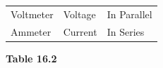 {\begin{center}
\begin{xtabular*}{\mytablewidth}[t]{|p{10\mystarwidth}|p{10\mystarwidth}|p{10\mystarwidth}|}
    
        Voltmeter &
    
    
        Voltage &
    
    
        In Parallel%
     \tabularnewline{}
    
    
        Ammeter &
    
    
        Current &
    
    
        In Series%
     \tabularnewline{}
    \end{xtabular*}
      \end{center}
    \begin{center}{\small\bfseries Table 16.2}\end{center}
    
    \addtocounter{footnote}{-0}
    
        }%
      
    \par
  
